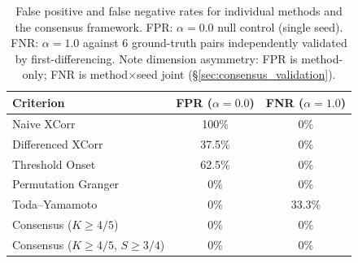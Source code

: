 \begin{table}[t]
\centering
\small
\caption{False positive and false negative rates for individual methods and the consensus framework. FPR: $\alpha{=}0.0$ null control (single seed). FNR: $\alpha{=}1.0$ against 6 ground-truth pairs independently validated by first-differencing. Note dimension asymmetry: FPR is method-only; FNR is method$\times$seed joint (\S\ref{sec:consensus_validation}).}
\label{tab:fpr_fnr}
\begin{tabular}{lcc}
\toprule
Criterion & FPR ($\alpha{=}0.0$) & FNR ($\alpha{=}1.0$) \\
\midrule
Naive XCorr              & 100\%  & 0\%  \\
Differenced XCorr        & 37.5\% & 0\%  \\
Threshold Onset          & 62.5\% & 0\%  \\
Permutation Granger      & 0\%    & 0\%  \\
Toda--Yamamoto           & 0\%    & 33.3\% \\
\midrule
Consensus ($K{\geq}4/5$)              & 0\%    & 0\%  \\
Consensus ($K{\geq}4/5$, $S{\geq}3/4$) & 0\%    & 0\%  \\
\bottomrule
\end{tabular}
\end{table}